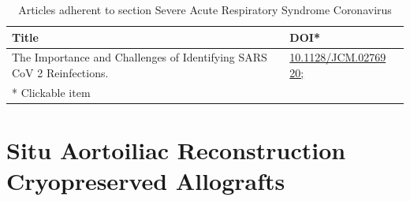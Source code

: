 \documentclass{qqtarticle}
\begin{document}
        \begin{table}[H]
        \scriptsize
        \centering
        \caption{Articles adherent to section Severe Acute Respiratory Syndrome Coronavirus}
        \renewcommand{\arraystretch}{1.5}
        \begin{tabular}{p{}l}
            \toprule 
            Title & DOI* \\     \midrule The Importance and Challenges of Identifying SARS CoV 2 Reinfections. \cite{TheImport6b3e7387} & \href{https://dx.doi.org/10.1128/JCM.02769 20; }{10.1128/JCM.02769 20; }\\     \midrule
            * Clickable item \\
            \bottomrule
        \end{tabular}
        \label{tab:topic12}
        \end{table}\section{Situ Aortoiliac Reconstruction Cryopreserved Allografts}
\end{document}
